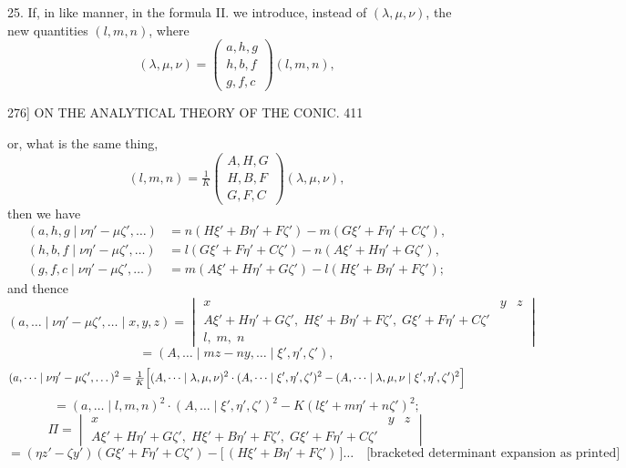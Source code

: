 \documentclass[11pt]{article}
\begin{document}
\textsc{25.} If, in like manner, in the formula \textsc{II.} we introduce, instead of $(\lambda,\mu,\nu)$, the
new quantities $(l,m,n)$, where
\[ (\lambda,\mu,\nu)=\begin{pmatrix}a,h,g\\ h,b,f\\ g,f,c\end{pmatrix}(l,m,n), \]

\begin{center}
\textsc{276]} \hfill ON THE ANALYTICAL THEORY OF THE CONIC. \hfill 411
\end{center}

or, what is the same thing,
\[ (l,m,n)=\tfrac{1}{K}\!\begin{pmatrix}A,H,G\\ H,B,F\\ G,F,C\end{pmatrix}\!(\lambda,\mu,\nu), \]
then we have
\[ \begin{aligned}
(a,h,g \mid \nu\eta'-\mu\zeta',\dots) &= n(H\xi'+B\eta'+F\zeta')-m(G\xi'+F\eta'+C\zeta'),\\
(h,b,f \mid \nu\eta'-\mu\zeta',\dots) &= l(G\xi'+F\eta'+C\zeta')-n(A\xi'+H\eta'+G\zeta'),\\
(g,f,c \mid \nu\eta'-\mu\zeta',\dots) &= m(A\xi'+H\eta'+G\zeta')-l(H\xi'+B\eta'+F\zeta');
\end{aligned} \]
and thence
\[ (a,\dots \mid \nu\eta'-\mu\zeta',\dots \mid x,y,z)
= \begin{vmatrix}
x & y & z\\
A\xi'+H\eta'+G\zeta',\;H\xi'+B\eta'+F\zeta',\;G\xi'+F\eta'+C\zeta'\\
l,\;m,\;n
\end{vmatrix} \]
\[ = (A,\dots \mid mz-ny,\dots \mid \xi',\eta',\zeta'), \]
\[ (a,\dots \mid \nu\eta'-\mu\zeta',\dots)^{2}
=\tfrac{1}{K}\Bigl[(A,\dots \mid \lambda,\mu,\nu)^{2}\cdot(A,\dots \mid \xi',\eta',\zeta')^{2}-(A,\dots \mid \lambda,\mu,\nu \mid \xi',\eta',\zeta')^{2}\Bigr] \]
\[ = (a,\dots \mid l,m,n)^{2}\cdot(A,\dots \mid \xi',\eta',\zeta')^{2}-K(l\xi'+m\eta'+n\zeta')^{2}; \]
\[ \Pi = \begin{vmatrix}
x & y & z\\
A\xi'+H\eta'+G\zeta',\;H\xi'+B\eta'+F\zeta',\;G\xi'+F\eta'+C\zeta'
\end{vmatrix} \]
\[ = (\eta z'-\zeta y')(G\xi'+F\eta'+C\zeta')-\bigl[\,(H\xi'+B\eta'+F\zeta')\,\bigr]\dots\quad\text{[bracketed determinant expansion as printed]} \]
\end{document}
